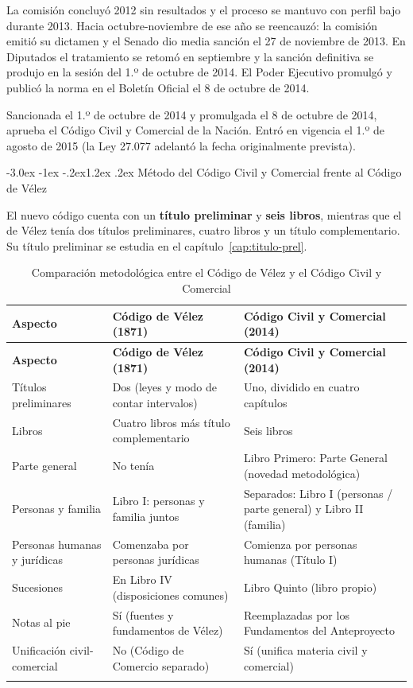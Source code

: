 \documentclass[12pt,oneside]{book}
\makeatletter
\renewcommand\section{\@startsection{section}{1}{\z@}%
  {-3.0ex \@plus -1ex \@minus -.2ex}{1.2ex \@plus .2ex}%
  {\normalfont\large\bfseries\color{acento}}}
\makeatother
\begin{document}
La comisión concluyó 2012 sin resultados y el proceso se mantuvo con perfil bajo durante 2013. Hacia octubre-noviembre de ese año se reencauzó: la comisión emitió su dictamen y el Senado dio media sanción el 27 de noviembre de 2013. En Diputados el tratamiento se retomó en septiembre y la sanción definitiva se produjo en la sesión del 1.º de octubre de 2014. El Poder Ejecutivo promulgó y publicó la norma en el Boletín Oficial el 8 de octubre de 2014.

\begin{importante}[Ley 26.994]
Sancionada el 1.º de octubre de 2014 y promulgada el 8 de octubre de 2014, aprueba el Código Civil y Comercial de la Nación. Entró en vigencia el 1.º de agosto de 2015 (la Ley 27.077 adelantó la fecha originalmente prevista).
\end{importante}

\section{Método del Código Civil y Comercial frente al Código de Vélez}

El nuevo código cuenta con un \textbf{título preliminar} y \textbf{seis libros}, mientras que el de Vélez tenía dos títulos preliminares, cuatro libros y un título complementario. Su título preliminar se estudia en el capítulo~\ref{cap:titulo-prel}.

\begin{longtable}{@{}B{0.20\textwidth}L{0.34\textwidth}L{0.34\textwidth}@{}}
\toprule
\textbf{Aspecto} & \textbf{Código de Vélez (1871)} & \textbf{Código Civil y Comercial (2014)} \\
\midrule
\endfirsthead
\toprule
\textbf{Aspecto} & \textbf{Código de Vélez (1871)} & \textbf{Código Civil y Comercial (2014)} \\
\midrule
\endhead
\bottomrule
\endfoot
Títulos preliminares & Dos (leyes y modo de contar intervalos) & Uno, dividido en cuatro capítulos \\
Libros & Cuatro libros más título complementario & Seis libros \\
Parte general & No tenía & Libro Primero: Parte General (novedad metodológica) \\
Personas y familia & Libro I: personas y familia juntos & Separados: Libro I (personas / parte general) y Libro II (familia) \\
Personas humanas y jurídicas & Comenzaba por personas jurídicas & Comienza por personas humanas (Título I) \\
Sucesiones & En Libro IV (disposiciones comunes) & Libro Quinto (libro propio) \\
Notas al pie & Sí (fuentes y fundamentos de Vélez) & Reemplazadas por los Fundamentos del Anteproyecto \\
Unificación civil-comercial & No (Código de Comercio separado) & Sí (unifica materia civil y comercial) \\
\caption{Comparación metodológica entre el Código de Vélez y el Código Civil y Comercial}\\
\end{longtable}
\end{document}
